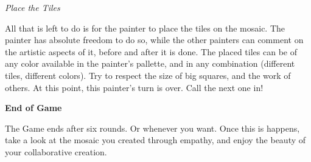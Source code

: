 \documentclass[twocolumn]{article}
\newcommand{\lvl}[1]{\vspace{0.5cm}\Large{\textbf{#1}}\vspace{0.2cm}}
\newcommand{\sublvl}[1]{\vspace{0.3cm}\large{\textit{#1}}\vspace{0.1cm}}
\begin{document}
\sublvl{Place the Tiles}

All that is left to do is for the painter to place the tiles on the mosaic. The painter has absolute freedom to do so, while the other painters can comment on the artistic aspects of it, before and after it is done. The placed tiles can be of any color available in the painter's pallette, and in any combination (different tiles, different colors). Try to respect the size of big squares, and the work of others.
% 
% 
% 
% 
At this point, this painter's turn is over. Call the next one in!

\lvl{End of Game}

The Game ends after six rounds. Or whenever you want. Once this is happens, take a look at the mosaic you created through empathy, and enjoy the beauty of your collaborative creation.

% 
% 
\end{document}
